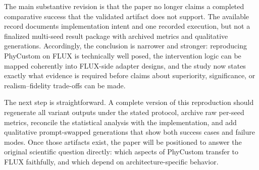 \documentclass{article}
\begin{document}
The main substantive revision is that the paper no longer claims a completed comparative success that the validated artifact does not support. The available record documents implementation intent and one recorded execution, but not a finalized multi-seed result package with archived metrics and qualitative generations. Accordingly, the conclusion is narrower and stronger: reproducing PhyCustom on FLUX is technically well posed, the intervention logic can be mapped coherently into FLUX-side adapter designs, and the study now states exactly what evidence is required before claims about superiority, significance, or realism--fidelity trade-offs can be made.

The next step is straightforward. A complete version of this reproduction should regenerate all variant outputs under the stated protocol, archive raw per-seed metrics, reconcile the statistical analysis with the implementation, and add qualitative prompt-swapped generations that show both success cases and failure modes. Once those artifacts exist, the paper will be positioned to answer the original scientific question directly: which aspects of PhyCustom transfer to FLUX faithfully, and which depend on architecture-specific behavior.

\FloatBarrier


\end{document}
